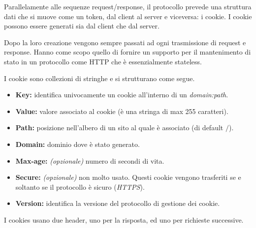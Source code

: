             Parallelamente alle sequenze request/response, il protocollo prevede una struttura dati che si muove come un token, dal client al server e viceversa: i cookie. I cookie possono essere generati sia dal client che dal server. 
            
            Dopo la loro creazione vengono sempre passati ad ogni trasmissione di request e response. Hanno come scopo quello di fornire un supporto per il mantenimento di stato in un protocollo come HTTP che è essenzialmente stateless. 
            
            I cookie sono collezioni di stringhe e si strutturano come segue.
            
            \begin{itemize}
                \item
                \textbf{Key:} identifica univocamente un cookie all’interno di un \textit{domain:path}.
                
                \item
                \textbf{Value:} valore associato al cookie (è una stringa di max 255 caratteri).
                
                \item
                \textbf{Path:} posizione nell’albero di un sito al quale è associato (di default \(/\)).
                
                \item
                \textbf{Domain:} dominio dove è stato generato.
                
                \item
                \textbf{Max-age:} \textit{(opzionale)} numero di secondi di vita.
                
                \item
                \textbf{Secure:} \textit{(opzionale)} non molto usato. Questi cookie vengono trasferiti se e soltanto se il protocollo è sicuro (\textit{HTTPS}).
            
                \item
                \textbf{Version:} identifica la versione del protocollo di gestione dei cookie.
                
            \end{itemize}
            
            \vspace{3mm}
            
            I cookies usano due header, uno per la risposta, ed uno per richieste successive. 
            
